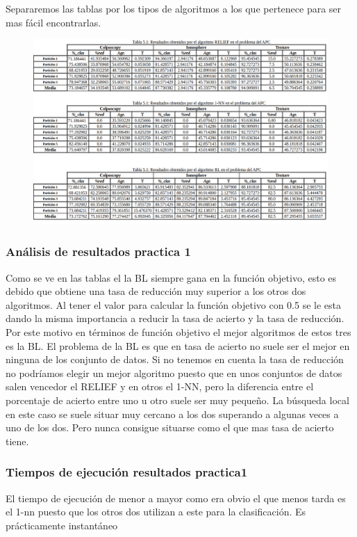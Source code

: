 \documentclass[titlepage]{article}
\begin{document}
	Separaremos las tablas por los tipos de algoritmos a los que pertenece para ser mas fácil encontrarlas.
	\begin{figure}[H]
		\centering
		\includegraphics[width=1\linewidth]{screenshot004}
		\caption{}
		\label{fig:screenshot004}
	\end{figure}
	
	
	\subsubsection{Análisis de resultados practica 1}
	Como se ve en las tablas el la BL siempre gana en la función objetivo, esto es debido que obtiene una tasa de reducción muy superior a los otros dos algoritmos. Al tener el valor para calcular la función objetivo con 0.5 se le esta dando la misma importancia a reducir la tasa de acierto y la tasa de reducción. Por este motivo en términos de función objetivo el mejor algoritmos de estos tres es la BL. El problema de la BL es que en tasa de acierto no suele ser el mejor en ninguna de los conjunto de datos. Si no tenemos en cuenta la tasa de reducción no podríamos elegir un mejor algoritmo puesto que en unos conjuntos de datos salen vencedor el RELIEF y en otros el 1-NN, pero la diferencia entre el porcentaje de acierto entre uno u otro suele ser muy pequeño. La búsqueda local en este caso se suele situar muy cercano a los dos superando a algunas veces a uno de los dos. Pero nunca consigue situarse como el que mas tasa de acierto tiene.
	
	\subsubsection{Tiempos de ejecución resultados practica1 }
		El tiempo de ejecución de menor a mayor como era obvio el que menos tarda es el 1-nn puesto que los otros dos utilizan a este para la clasificación. Es prácticamente instantáneo
	
\end{document}
